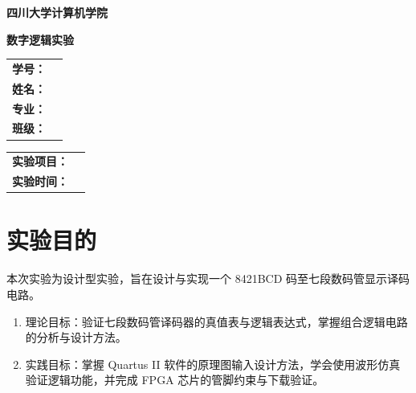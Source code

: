 \documentclass[12pt, a4paper]{article}
\begin{document}
\begin{center}
{\LARGE\textbf{四川大学计算机学院}\par}
\vspace{2mm}
{\Large\textbf{数字逻辑实验}\par}
\vspace{10mm}

{\large
\begin{tabular}{ll}
\textbf{学号：} & \underline{\hspace{5cm}} \\
\textbf{姓名：} & \underline{\hspace{5cm}} \\
\textbf{专业：} & \underline{\hspace{5cm}} \\
\textbf{班级：} & \underline{\hspace{5cm}} \\
\end{tabular}
\par}
\vspace{8mm}

{\large
\begin{tabular}{ll}
\textbf{实验项目：} & \underline{\hspace{8cm}} \\
\textbf{实验时间：} & \underline{\hspace{8cm}} \\
\end{tabular}
\par}
\end{center}

\vspace{15mm}

\section*{实验目的}

本次实验为设计型实验，旨在设计与实现一个 8421BCD 码至七段数码管显示译码电路。

\begin{enumerate}
\item 理论目标：验证七段数码管译码器的真值表与逻辑表达式，掌握组合逻辑电路的分析与设计方法。
\item 实践目标：掌握 Quartus II 软件的原理图输入设计方法，学会使用波形仿真验证逻辑功能，并完成 FPGA 芯片的管脚约束与下载验证。
\end{enumerate}
\end{document}
